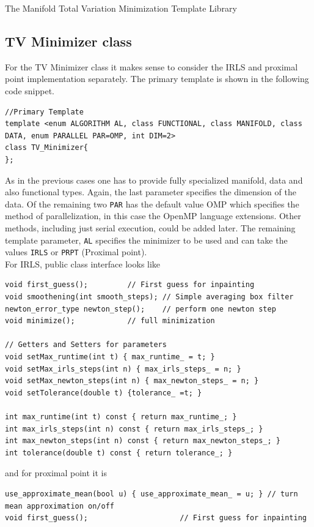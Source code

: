 \begin{chapter}{The Manifold Total Variation Minimization Template Library}
\subsection{TV Minimizer class} %
\label{sub:TVMinimizer class}
For the TV Minimizer class it makes sense to consider the IRLS and proximal point implementation separately. The primary template is shown in the following code snippet.
\cppinline
\begin{lstlisting}
//Primary Template 
template <enum ALGORITHM AL, class FUNCTIONAL, class MANIFOLD, class DATA, enum PARALLEL PAR=OMP, int DIM=2>
class TV_Minimizer{ 
};
\end{lstlisting}
As in the previous cases one has to provide fully specialized manifold, data and also functional types. Again, the last parameter specifies the dimension of the data. Of the
remaining two \texttt{PAR} has the default value OMP which specifies the method of parallelization, in this case the OpenMP language extensions. Other methods, including just serial
execution, could be added later. The remaining template parameter, \texttt{AL} specifies the minimizer to be used and can take the values \texttt{IRLS} or \texttt{PRPT} (Proximal point).\\

For IRLS, public class interface looks like\\
\cppinline
\begin{lstlisting}
void first_guess();		    // First guess for inpainting
void smoothening(int smooth_steps); // Simple averaging box filter
newton_error_type newton_step();    // perform one newton step
void minimize();		    // full minimization

// Getters and Setters for parameters
void setMax_runtime(int t) { max_runtime_ = t; }
void setMax_irls_steps(int n) { max_irls_steps_ = n; }
void setMax_newton_steps(int n) { max_newton_steps_ = n; }
void setTolerance(double t) {tolerance_ =t; }
	    
int max_runtime(int t) const { return max_runtime_; }
int max_irls_steps(int n) const { return max_irls_steps_; }
int max_newton_steps(int n) const { return max_newton_steps_; }
int tolerance(double t) const { return tolerance_; }
\end{lstlisting}

and for proximal point it is\\
\cppinline
\begin{lstlisting}
use_approximate_mean(bool u) { use_approximate_mean_ = u; } // turn mean approximation on/off
void first_guess();					    // First guess for inpainting
 

\end{lstlisting}
\end{chapter}
